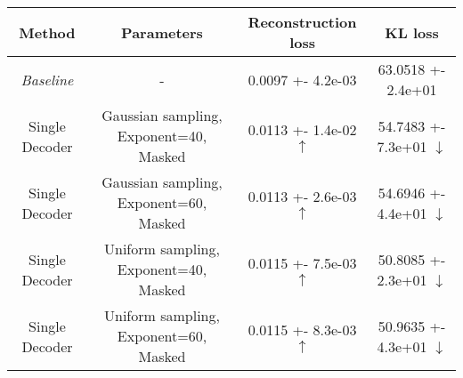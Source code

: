 \centering
\scriptsize
\begin{tabular}{||c|c|c|c||}
\hline
 Method & Parameters & Reconstruction loss & KL loss \\
\hline
\textit{Baseline} & - & 0.0097 +- 4.2e-03 & 63.0518 +- 2.4e+01 \\
\hline
Single Decoder & Gaussian sampling, Exponent=40, Masked & 0.0113 +- 1.4e-02  $\uparrow$ & 54.7483 +- 7.3e+01  $\downarrow$ \\
\hline
Single Decoder & Gaussian sampling, Exponent=60, Masked & 0.0113 +- 2.6e-03  $\uparrow$ & 54.6946 +- 4.4e+01  $\downarrow$ \\
\hline
Single Decoder & Uniform sampling, Exponent=40, Masked & 0.0115 +- 7.5e-03  $\uparrow$ & 50.8085 +- 2.3e+01  $\downarrow$ \\
\hline
Single Decoder & Uniform sampling, Exponent=60, Masked & 0.0115 +- 8.3e-03  $\uparrow$ & 50.9635 +- 4.3e+01  $\downarrow$ \\
\hline
\end{tabular}
